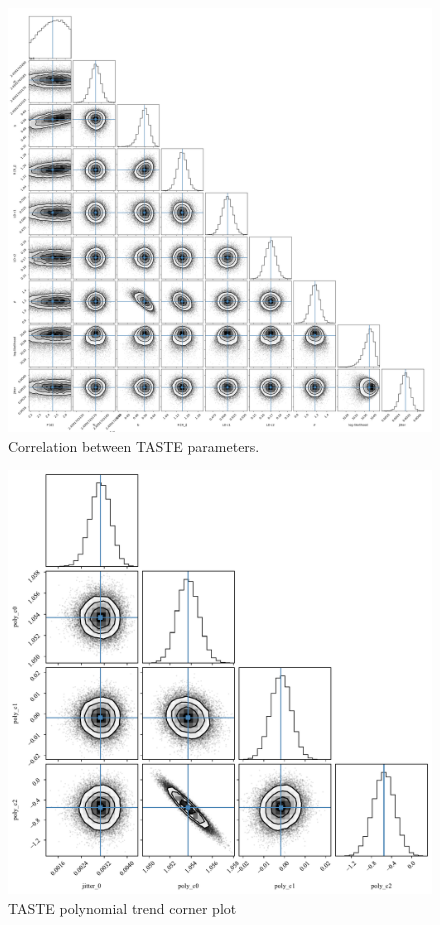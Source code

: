 \documentclass{aa}
\begin{document}
\begin{figure}[H]
    \centering
      \includegraphics[scale=0.18, angle=0]{pictures/corner_taste.png}
      \caption{Correlation between TASTE parameters.}
\end{figure}

\begin{figure}[H]
  \centering
    \includegraphics[scale=0.4, angle=0]{pictures/poly.pdf}
    \caption{TASTE polynomial trend corner plot}
\end{figure}
\end{document}
